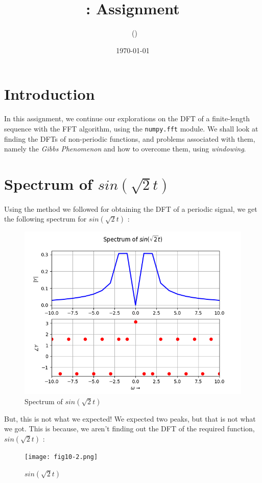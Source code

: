 \documentclass[11pt, a4paper, twoside]{article}
\title{\courseNumber : Assignment \assignmentNumber}
\author{\myName\ (\rollNumber)}
\date{\today}
\begin{document}
\maketitle

\section{Introduction}
    In this assignment, we continue our explorations on the DFT of a finite-length sequence with the FFT algorithm, using the \texttt{numpy.fft} module. We shall look at finding the DFTs of non-periodic functions, and problems associated with them, namely the \textit{Gibbs Phenomenon} and how to overcome them, using \textit{windowing}.

\section{Spectrum of $sin(\sqrt{2}t)$}
    Using the method we followed for obtaining the DFT of a periodic signal, we get the following spectrum for $sin(\sqrt{2}t)$ :
    \begin{figure}
        \centering
        \includegraphics[scale=0.5]{Fig0.png}
        \caption{Spectrum of $sin(\sqrt{2}t)$}
        \label{fig:Fig0}
    \end{figure}
    
    But, this is not what we expected! We expected two peaks, but that is not what we got. This is because, we aren't finding out the DFT of the required function, $sin(\sqrt{2}t)$ :
    \begin{figure}
        \centering
        \texttt{[image: fig10-2.png]}
        \caption{$sin(\sqrt{2}t)$}
        \label{fig:fig10-2}
    \end{figure}
    
\end{document}
